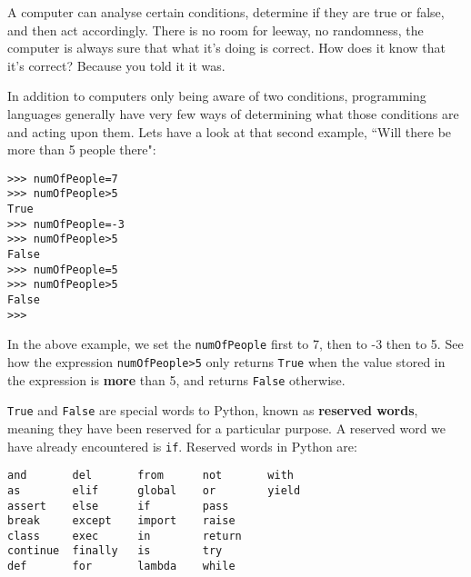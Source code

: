  A computer can analyse certain conditions, determine if they are true or false, and then act accordingly. There is no room for leeway, no randomness, the computer is always sure that what it's doing is correct. How does it know that it's correct? Because you told it it was.

In addition to computers only being aware of two conditions,   programming languages generally have very few ways of determining what   those conditions are and acting upon them. Lets have a look at that second example, ``Will there be more than 5 people there":


\begin{lstlisting}
>>> numOfPeople=7
>>> numOfPeople>5
True
>>> numOfPeople=-3
>>> numOfPeople>5
False
>>> numOfPeople=5
>>> numOfPeople>5
False
>>> 

		\end{lstlisting}

In the above example, we set the \texttt{numOfPeople} first to 7, then to -3 then to 5. See how the expression 
\texttt{numOfPeople>5} only returns 
\texttt{True} when the value stored in the expression is \textbf{more} than 5, and returns 
\texttt{False} otherwise.    

\texttt{True} and \texttt{False} are special words to Python, known as   \textbf{reserved words}, meaning they have been reserved for a   particular purpose. A reserved word we have already encountered is   \texttt{if}. Reserved words in Python are:
{\bfseries\begin{lstlisting}
and       del       from      not       with
as        elif      global    or        yield
assert    else      if        pass      
break     except    import    raise
class     exec      in        return
continue  finally   is        try
def       for       lambda    while
                \end{lstlisting}}

